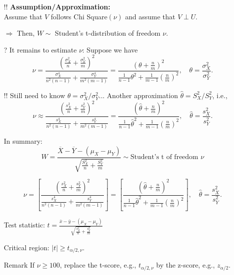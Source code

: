 \begin{frame}
\begin{itemize}
	\item[!!] {\bf Assumption/Approximation:} \\[1em]
		Assume that $V$ follows Chi Square$(\nu)$ and assume that $V\perp U$.
	\vfill
\item[$\Longrightarrow$] Then, $W\sim$ Student's t-distribution of freedom $\nu$.
	\vfill
\item[?] It remains to estimate $\nu$: Suppose we have
\[
\nu= \frac{\left(  \frac{\sigma_X^2}{n}+ \frac{\sigma_Y^2}{m} \right)^2 }
{ \frac{\sigma_X^4}{n^2(n-1)}+\frac{\sigma_Y^4}{m^2(m-1) }}
=
\frac{\left(\theta+ \frac{n}{m} \right)^2}{ \frac{1}{n-1}\theta^2 +  \frac{1}{m-1}\left(  \frac{n}{m}\right)^2},
\quad \theta= \frac{\sigma_X^2}{\sigma_Y^2}.
\]
\vfill
\item[!!] Still need to know $\theta = \sigma_X^2/\sigma_Y^2$... Another approximation $\hat\theta=S_X^2/S_Y^2$, i.e., \\[1em]
\[
\nu \approx
\frac{\left(\frac{s_X^2}{n}+ \frac{s_Y^2}{m} \right)^2 }
{ \frac{s_X^4}{n^2(n-1)}+\frac{s_Y^4}{m^2(m-1) }}
=  \frac{\left(\hat\theta+ \frac{n}{m} \right)^2}{ \frac{1}{n-1}\hat\theta^2 +  \frac{1}{m-1}\left(  \frac{n}{m}\right)^2},
\quad \hat\theta= \frac{s_X^2}{s_Y^2}.
\]
\end{itemize}

\end{frame}
\begin{frame}

\begin{enumerate}
	\item[] In summary: \\[1em]
		\[
			W =  \frac{\overline{X}-\overline{Y}-(\mu_X-\mu_Y)}{\sqrt{ \frac{S^2_X}{n}+\frac{S^2_Y}{m} }}
			\sim \text{Student's t of freedom $\nu$}
		\]
\vfill
\item[]
\[
	\nu  = \left[
\frac{\left(\frac{s_X^2}{n}+ \frac{s_Y^2}{m} \right)^2 }
{ \frac{s_X^4}{n^2(n-1)}+\frac{s_Y^4}{m^2(m-1) }}
	\right]
	=
	\left[
\frac{\left(\hat\theta+ \frac{n}{m} \right)^2}{ \frac{1}{n-1}\hat\theta^2 +  \frac{1}{m-1}\left(  \frac{n}{m}\right)^2}
	\right],
\quad \hat\theta= \frac{s_X^2}{s_Y^2}.
\]
\vfill
\item[] Test statistic: $t = \frac{\bar{x}-\bar{y}-(\mu_X-\mu_Y)}{\sqrt{ \frac{s^2_X}{n}+\frac{s^2_Y}{m} }}
$
\vfill
\item[] Critical region: $|t|\ge t_{\alpha/2,\nu}$.\myEnd
	\vfill
\item[Remark] If $\nu \ge 100$, replace the t-score, e.g., $t_{\alpha/2,\nu}$ by the z-score, e.g., $z_{\alpha/2}$.
	\end{enumerate}
\end{frame}
